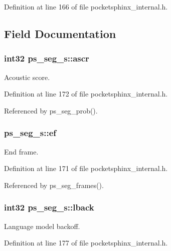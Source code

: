 Definition at line 166 of file pocketsphinx\-\_\-internal.\-h.



\subsection{Field Documentation}
\subsubsection[{ascr}]{\setlength{\rightskip}{0pt plus 5cm}int32 ps\-\_\-seg\-\_\-s\-::ascr}\label{structps__seg__s_a6f7706ec4c0d0ec8ecafaf0f29f41f4b}


Acoustic score. 



Definition at line 172 of file pocketsphinx\-\_\-internal.\-h.



Referenced by ps\-\_\-seg\-\_\-prob().

\subsubsection[{ef}]{ ps\-\_\-seg\-\_\-s\-::ef}\label{structps__seg__s_ab25ecc6af8d2695c6097cf7e934eadd4}


End frame. 



Definition at line 171 of file pocketsphinx\-\_\-internal.\-h.



Referenced by ps\-\_\-seg\-\_\-frames().

\subsubsection[{lback}]{\setlength{\rightskip}{0pt plus 5cm}int32 ps\-\_\-seg\-\_\-s\-::lback}\label{structps__seg__s_a4d86c21f1ed2dc3eb3b1b1b37ce9bb48}


Language model backoff. 



Definition at line 177 of file pocketsphinx\-\_\-internal.\-h.



